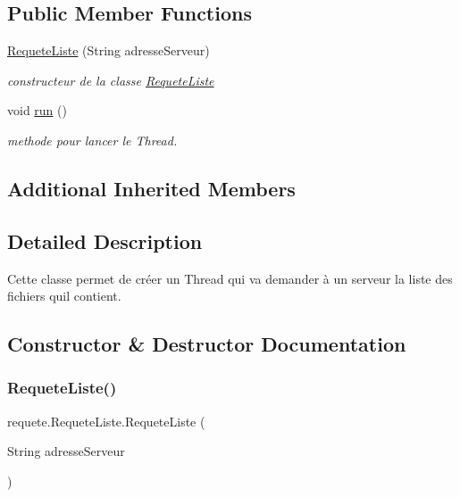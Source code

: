 \subsection*{Public Member Functions}
\begin{DoxyCompactItemize}
\item 
\hyperlink{classrequete_1_1RequeteListe_abf11f2cbe8b9eb9eae7621dff966ebd5}{Requete\+Liste} (String adresse\+Serveur)
\begin{DoxyCompactList}\small\item\em constructeur de la classe \hyperlink{classrequete_1_1RequeteListe}{Requete\+Liste} \end{DoxyCompactList}\item 
\mbox{\label{classrequete_1_1RequeteListe_a744397e5813266c362903f65965e0e4e}} 
void \hyperlink{classrequete_1_1RequeteListe_a744397e5813266c362903f65965e0e4e}{run} ()
\begin{DoxyCompactList}\small\item\em methode pour lancer le Thread. \end{DoxyCompactList}\end{DoxyCompactItemize}
\subsection*{Additional Inherited Members}


\subsection{Detailed Description}
Cette classe permet de créer un Thread qui va demander à un serveur la liste des fichiers qu\textquotesingle{}il contient. 

\subsection{Constructor \& Destructor Documentation}
\mbox{\label{classrequete_1_1RequeteListe_abf11f2cbe8b9eb9eae7621dff966ebd5}} 
\subsubsection{\texorpdfstring{Requete\+Liste()}{RequeteListe()}}
{\footnotesize\ttfamily requete.\+Requete\+Liste.\+Requete\+Liste (\begin{DoxyParamCaption}\item[{String}]{adresse\+Serveur }\end{DoxyParamCaption})\hspace{0.3cm}{\ttfamily [inline]}}



